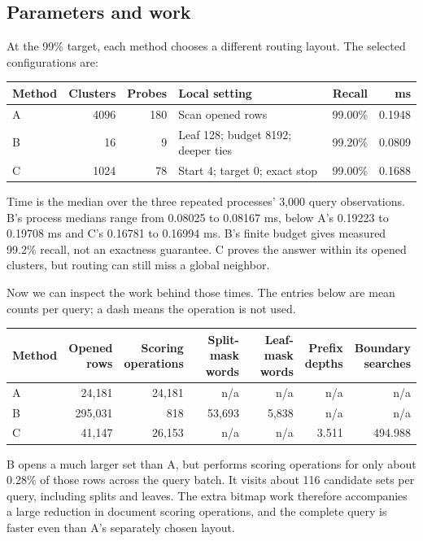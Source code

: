 \subsection{Parameters and work}
At the 99\% target, each method chooses a different routing layout. The selected configurations are:
\begin{center}\small
\begin{tabularx}{\linewidth}{@{}lrrYrr@{}}\toprule
Method & Clusters & Probes & Local setting & Recall & ms\\\midrule
A & 4096 & 180 & Scan opened rows & 99.00\% & 0.1948\\
B & 16 & 9 & Leaf 128; budget 8192; deeper ties & 99.20\% & 0.0809\\
C & 1024 & 78 & Start 4; target 0; exact stop & 99.00\% & 0.1688\\\bottomrule
\end{tabularx}
\end{center}
Time is the median over the three repeated processes' 3,000 query observations. B's process medians range from 0.08025 to 0.08167 ms, below A's 0.19223 to 0.19708 ms and C's 0.16781 to 0.16994 ms. B's finite budget gives measured 99.2\% recall, not an exactness guarantee. C proves the answer within its opened clusters, but routing can still miss a global neighbor.

Now we can inspect the work behind those times. The entries below are mean counts per query; a dash means the operation is not used.
\begin{center}\small
\begin{tabular}{@{}lrrrrrr@{}}\toprule
Method & \shortstack{Opened\\rows} & \shortstack{Scoring\\operations} & \shortstack{Split-mask\\words} & \shortstack{Leaf-mask\\words} & \shortstack{Prefix\\depths} & \shortstack{Boundary\\searches}\\\midrule
A & 24,181 & 24,181 & n/a & n/a & n/a & n/a\\
B & 295,031 & 818 & 53,693 & 5,838 & n/a & n/a\\
C & 41,147 & 26,153 & n/a & n/a & 3.511 & 494.988\\\bottomrule
\end{tabular}
\end{center}
B opens a much larger set than A, but performs scoring operations for only about 0.28\% of those rows across the query batch. It visits about 116 candidate sets per query, including splits and leaves. The extra bitmap work therefore accompanies a large reduction in document scoring operations, and the complete query is faster even than A's separately chosen layout.

